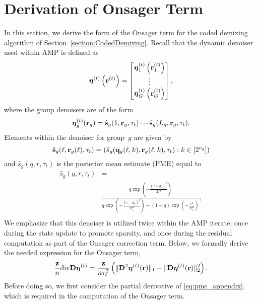\documentclass[journal]{IEEEtran}
\begin{document}
\appendices

\section{Derivation of Onsager Term}
\label{appendix:onsagerderivation}

In this section, we derive the form of the Onsager term for the coded demixing algorithm of Section~\ref{section:CodedDemixing}.
Recall that the dynamic denoiser used within AMP is defined as
\begin{equation} \label{eq:dynamicdenoiser_appendix}
     \boldsymbol{\eta}^{(t)}\left(\mathbf{r}^{(t)}\right)
     = \begin{bmatrix} \boldsymbol{\eta}_1^{(t)}\left(\mathbf{r}_1^{(t)}\right) \\
    \vdots \\ \boldsymbol{\eta}_G^{(t)}\left(\mathbf{r}_G^{(t)}\right) \end{bmatrix},
\end{equation}
where the group denoisers are of the form
\begin{equation}
    \boldsymbol{\eta}^{(t)}_{g}(\mathbf{r}_g) = \hat{\mathbf{s}}_{g}(1, \mathbf{r}_g, \tau_t) \cdots \hat{\mathbf{s}}_{g}(L_g, \mathbf{r}_g, \tau_t).
\end{equation}
Elements within the denoiser for group~$g$ are given by
\begin{equation}
    \label{eq:jointpme_appendix}
    \hat{\mathbf{s}}_{g}(\ell, \mathbf{r}_g(\ell), \tau_t) = \left( \hat{s}_{g}(\mathbf{q}_g(\ell, k), \mathbf{r}_g(\ell, k), \tau_t) : k \in [2^{v_g}] \right)
\end{equation}
and $\hat{s}_{g} \left( q, r, \tau_t \right)$ is the posterior mean estimate (PME) equal to
\begin{equation} \label{eq:pme_appendix}
    \begin{split}
        \hat{s}_{g} \left( q, r, \tau_t \right) &=     \\
        &\frac{q \exp \left( - \frac{ \left( r - d_{g} \right)^2}{2 \tau_t^2} \right)}
        { q \exp \left( - \frac{ \left( r -  d_{g} \right)^2}{2 \tau_t^2} \right)
        + (1-q) \exp \left( -\frac{r^2}{2 \tau_t^2} \right)}, \\
    \end{split}
\end{equation}
We emphasize that this denoiser is utilized twice within the AMP iterate: once during the state update to promote sparsity, and once during the residual computation as part of the Onsager correction term.
Below, we formally derive the needed expression for the Onsager term,
\begin{equation}
    \label{eq:onsagercorrectionterm_appendix}
    \frac{\mathbf{z}}{n}\mathrm{div}\mathbf{D}\boldsymbol{\eta}^{(t)} = \frac{\mathbf{z}}{n \tau_t^2}\left(
    \| \mathbf{D}^2\boldsymbol{\eta}^{(t)}(\mathbf{r}) \|_1 - \| \mathbf{D}\boldsymbol{\eta}^{(t)}(\mathbf{r}) \|_2^2 \right) .
\end{equation}
Before doing so, we first consider the partial derivative of \eqref{eq:pme_appendix}, which is required in the computation of the Onsager term. 
\end{document}
